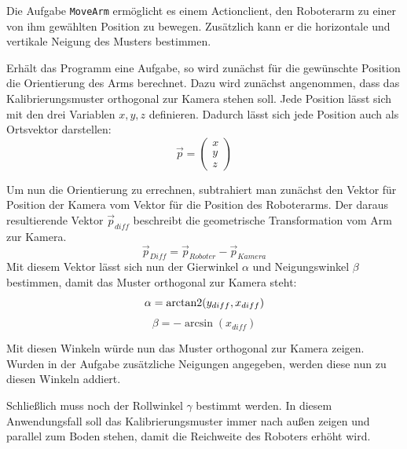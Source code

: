 Die Aufgabe \texttt{MoveArm} ermöglicht es einem Actionclient, den Roboterarm zu einer von ihm gewählten Position zu bewegen. Zusätzlich kann er die horizontale und vertikale Neigung des Musters bestimmen.

Erhält das Programm eine Aufgabe, so wird zunächst für die gewünschte Position die Orientierung des Arms berechnet. Dazu wird zunächst angenommen, dass das Kalibrierungsmuster orthogonal zur Kamera stehen soll. Jede Position lässt sich mit den drei Variablen $x, y, z$ definieren. Dadurch lässt sich jede Position auch als Ortsvektor darstellen:
\begin{equation}
	\vec{p} = 
	\begin{pmatrix}
		x\\
		y\\
		z
	\end{pmatrix}
\end{equation}

Um nun die Orientierung zu errechnen, subtrahiert man zunächst den Vektor für Position der Kamera vom Vektor für die Position des Roboterarms. Der daraus resultierende Vektor $\vec{p}_{diff}$ beschreibt die geometrische Transformation vom Arm zur Kamera. 
\begin{equation}\label{eq:diff}
	\vec{p}_{Diff} = \vec{p}_{Roboter} - \vec{p}_{Kamera}
\end{equation}
Mit diesem Vektor lässt sich nun der Gierwinkel $\alpha$ und Neigungswinkel $\beta$ bestimmen, damit das Muster orthogonal zur Kamera steht:
\begin{equation}\label{eq:pitch}
	\alpha = \operatorname{arctan2}(y_{diff}, x_{diff})
\end{equation}
\begin{equation}\label{eq:yaw}
	\beta = -\arcsin(x_{diff})
\end{equation}

Mit diesen Winkeln würde nun das Muster orthogonal zur Kamera zeigen. Wurden in der Aufgabe zusätzliche Neigungen angegeben, werden diese nun zu diesen Winkeln addiert.

Schließlich muss noch der Rollwinkel $\gamma$ bestimmt werden. In diesem Anwendungsfall soll das Kalibrierungsmuster immer nach außen zeigen und parallel zum Boden stehen, damit die Reichweite des Roboters erhöht wird.


